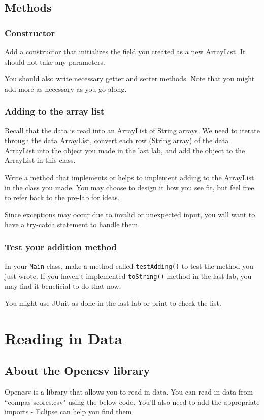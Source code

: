 \documentclass[12pt]{article}
\begin{document}
\subsection{Methods}

\subsubsection{Constructor}
Add a constructor that initializes the field you created as a new ArrayList. It should not take any parameters.

You should also write necessary getter and setter methods. Note that you might add more as necessary as you go along.

\subsubsection{Adding to the array list}
\label{add-method}
Recall that the data is read into an ArrayList of String arrays. We need to iterate through the data ArrayList, convert each row (String array) of the data ArrayList into the object you made in the last lab, and add the object to the ArrayList in this class.

Write a method that implements or helps to implement adding to the ArrayList in the class you made. You may choose to design it how you see fit, but feel free to refer back to the pre-lab for ideas.

Since exceptions may occur due to invalid or unexpected input, you will want to have a try-catch statement to handle them.

\subsubsection{Test your addition method}
In your \texttt{Main} class, make a method called \texttt{testAdding()} to test the method you just wrote. If you haven't implemented \texttt{toString()} method in the last lab, you may find it beneficial to do that now.

You might use JUnit as done in the last lab or print to check the list.

\section{Reading in Data}

\subsection{About the Opencsv library}
Opencsv is a library that allows you to read in data.  You can read in data from ``compas-scores.csv" using the below code.  You'll also need to add the appropriate imports - Eclipse can help you find them.
\end{document}
